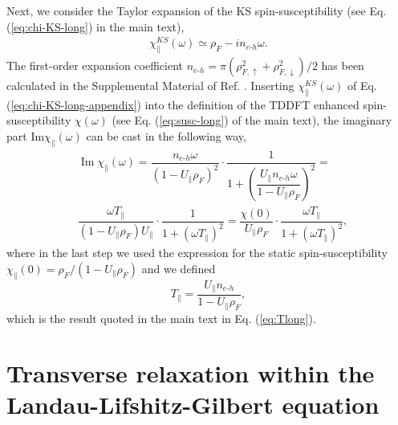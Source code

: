 \documentclass[prb,footinbib,showpacs,twocolumn,amsmath,amssymb]{revtex4}
\renewcommand\Im{\operatorname{Im}}
\newcommand{\bek}{\begin{eqnarray}}
\newcommand{\ek}{\end{eqnarray}}
\begin{document}
Next, we consider the Taylor expansion of the KS spin-susceptibility
(see Eq. (\ref{eq:chi-KS-long}) in the main text),
\bek\label{eq:chi-KS-long-appendix}
\chi^{KS}_{\parallel}(\omega)\simeq \rho_{F}   -in_{e\text{-}h}\omega.
\ek
The first-order expansion coefficient 
$n_{e\text{-}h}=\pi(\rho^{2}_{F,\uparrow}+\rho^{2}_{F,\downarrow})/2$ has been calculated in the Supplemental
Material of Ref.  .
Inserting $\chi^{KS}_{\parallel}(\omega)$ of 
Eq. (\ref{eq:chi-KS-long-appendix}) into the definition of the
TDDFT enhanced spin-susceptibility $\chi(\omega)$ 
(see Eq. (\ref{eq:susc-long}) of the main text), the imaginary part
$\text{Im}\chi_{\parallel}(\omega)$ can be cast in the following way,
\begin{equation}
\begin{split}
\label{eq:susc-T1-conn}
& \Im\chi_{\parallel}(\omega)=\dfrac{n_{e\text{-}h}\omega}
{(1-U_{\parallel}\rho_{F})^{2}}
\cdot\dfrac{1}
{1+\left(\dfrac{U_{\parallel}n_{e\text{-}h}\omega}{1-U_{\parallel}\rho_{F}}\right)^{2}} =\\ 
& \dfrac{\omega T_{\parallel}}
{(1-U_{\parallel}\rho_{F})U_{\parallel}}
\cdot\dfrac{1}
{1+(\omega T_{\parallel})^{2}}=
\dfrac{\chi(0)}{U_{\parallel}\rho_{F}}
\cdot\dfrac{\omega T_{\parallel}}
{1+(\omega T_{\parallel})^{2}},
\end{split}
\end{equation}
where in the last step we used the expression for the static spin-susceptibility
$\chi_{\parallel}(0) =\rho_{F}/(1-U_{\parallel}\rho_{F})$
and we defined 
\begin{equation}
T_{\parallel}=\dfrac{U_{\parallel}n_{e\text{-}h}}{1-U_{\parallel}\rho_{F}},
\end{equation}
which is the result quoted in the main text in Eq. (\ref{eq:Tlong}).



\section{Transverse relaxation within the Landau-Lifshitz-Gilbert equation}
\label{appendix:LLG}
\end{document}

